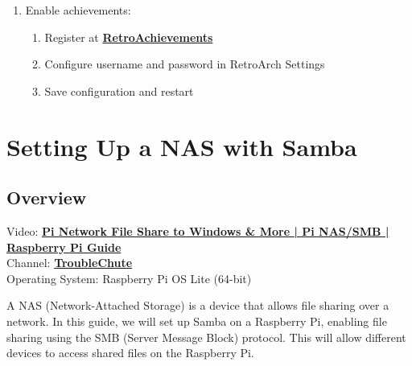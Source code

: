\documentclass[a4paper,12pt]{article}
\begin{document}
\begin{enumerate}
    \item Enable achievements:
    \begin{enumerate}
        \item Register at \href{https://retroachievements.org}{\textbf{\color{blue}RetroAchievements}}
        \item Configure username and password in RetroArch Settings
        \item Save configuration and restart
    \end{enumerate}
\end{enumerate}

\section{Setting Up a NAS with Samba}

\subsection{Overview}
Video: \href{https://www.youtube.com/watch?v=8QxJWW0mjAs}{\textbf{\color{blue}Pi Network File Share to Windows \& More | Pi NAS/SMB | Raspberry Pi Guide}} \\
Channel: \href{https://www.youtube.com/@TroubleChute}{\textbf{\color{blue}TroubleChute}} \\
Operating System: Raspberry Pi OS Lite (64-bit)

A NAS (Network-Attached Storage) is a device that allows file sharing over a network. In this guide, we will set up Samba on a Raspberry Pi, enabling file sharing using the SMB (Server Message Block) protocol. This will allow different devices to access shared files on the Raspberry Pi.
\end{document}
